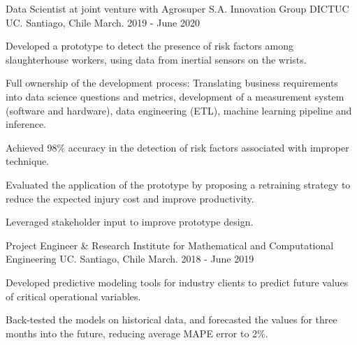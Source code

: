 

\begin{cventries}


\cventry
{Data Scientist at joint venture with Agrosuper S.A. Innovation Group} %
{DICTUC UC.} %
{Santiago, Chile} %
{March. 2019 - June 2020} %
{
  \begin{cvitems} %
    \item {Developed a prototype to detect the presence of risk factors among slaughterhouse workers, using 
    data from inertial sensors on the wrists.}
    \item {Full ownership of the development process: Translating business requirements into data science questions and metrics, development of
   a measurement system (software and hardware), data engineering (ETL), machine learning pipeline and inference.}
    \item {Achieved 98\% accuracy in the detection of risk factors associated with improper technique.}
    \item {Evaluated the application of the prototype by proposing a retraining strategy to reduce the expected injury cost and improve productivity.}
    \item {Leveraged stakeholder input to improve prototype design.}
  \end{cvitems}
}
\cventry
{Project Engineer \& Research} %
{Institute for Mathematical and Computational Engineering UC.} %
{Santiago, Chile} %
{March. 2018 - June 2019} %
{
  \begin{cvitems} %
    \item {Developed predictive modeling tools for industry clients to predict future values of critical operational variables}.
    \item {Back-tested the models on historical data, and forecasted the values for three months into the future, reducing average MAPE error to 2\%.}
  \end{cvitems}
}


\end{cventries}
